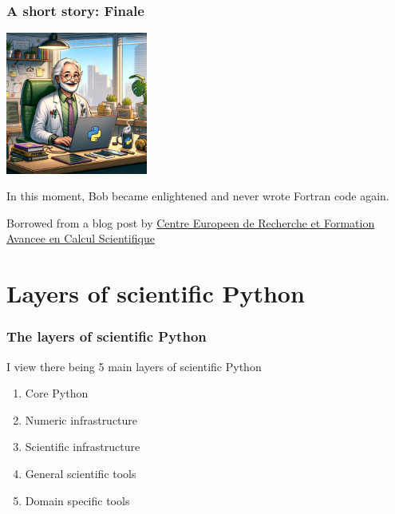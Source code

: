 \documentclass[
    xcolor={svgnames,dvipsnames},
    hyperref={colorlinks, citecolor=DeepPink4, linkcolor=DarkRed, urlcolor=DarkBlue}
]{beamer}  %
\newcommand{\1}{\mathbbm 1}
\begin{document}
\begin{frame}
    \frametitle{A short story: Finale}

    \begin{center}
        \includegraphics[width=0.35\textwidth]{bob_enlightened.png}
    \end{center}

    In this moment, Bob became enlightened and never wrote Fortran code again.

    Borrowed from a blog post by \href{https://cerfacs.fr/coop/fortran-vs-python}{Centre Europeen de Recherche et Formation Avancee en Calcul Scientifique}

\end{frame}


\section{Layers of scientific Python}
\begin{frame}
    \frametitle{The layers of scientific Python}

    I view there being 5 main layers of scientific Python

    \begin{enumerate}
        \item Core Python
        \item Numeric infrastructure
        \item Scientific infrastructure
        \item General scientific tools
        \item Domain specific tools
    \end{enumerate}

\end{frame}
\end{document}
